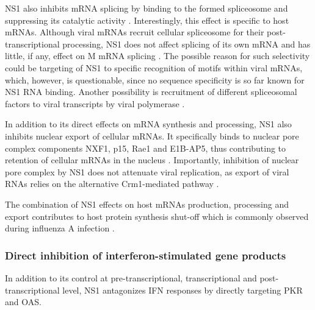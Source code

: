 		NS1 also inhibits mRNA splicing by binding to the formed spliceosome and suppressing its catalytic activity \parencite{Lu1994, Qiu1995}. Interestingly, this effect is specific to host mRNAs. Although viral mRNAs recruit cellular spliceosome for their post-transcriptional processing, NS1 does not affect splicing of its own mRNA \parencite{Robb2010} and has little, if any, effect on M mRNA splicing \parencite{Salvatore2002, Robb2012}. The possible reason for such selectivity could be targeting of NS1 to specific recognition of motifs within viral mRNAs, which, however, is questionable, since no sequence specificity is so far known for NS1 RNA binding. Another possibility is recruitment of different spliceosomal factors to viral transcripts by viral polymerase \parencite{Fournier2014}.
		
		In addition to its direct effects on mRNA synthesis and processing, NS1 also inhibits nuclear export of cellular mRNAs. It specifically binds to nuclear pore complex components NXF1, p15, Rae1 and E1B-AP5, thus contributing to retention of cellular mRNAs in the nucleus \parencite{Satterly2007}. Importantly, inhibition of nuclear pore complex by NS1 does not attenuate viral replication, as export of viral RNAs relies on the alternative Crm1-mediated pathway \parencite{Neumann2000}.
		
		The combination of NS1 effects on host mRNAs production, processing and export contributes to host protein synthesis shut-off which is commonly observed during influenza A infection \parencite{Beloso1992}.
		
		\subsubsection{Direct inhibition of interferon-stimulated gene products} \label{sec:direct_inhibition}
		
		In addition to its control at pre-transcriptional, transcriptional and post-transcriptional level, NS1 antagonizes \gls{IFN} responses by directly targeting \gls{PKR} and \gls{OAS}. 
		
